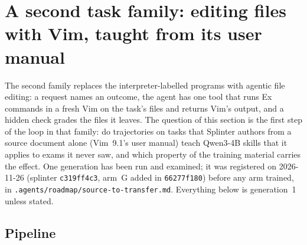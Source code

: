 \section{A second task family: editing files with Vim, taught from its user manual}\label{sec:vim}

The second family replaces the interpreter-labelled programs with agentic file editing: a request names an outcome, the agent
has one tool that runs Ex commands in a fresh Vim on the task's files and returns Vim's output, and a hidden check grades the
files it leaves. The question of this section is the first step of the loop in that family: do trajectories on tasks that
Splinter authors from a source document alone (Vim~9.1's user manual) teach Qwen3-4B skills that it applies to exams it never
saw, and which property of the training material carries the effect. One generation has been run and examined; it was
registered on 2026-11-26 (splinter \texttt{c319ff4c3}, arm~G added in \texttt{66277f180}) before any arm trained, in
\texttt{.agents/roadmap/source-to-transfer.md}. Everything below is generation~1 unless stated.

\subsection{Pipeline}\label{sec:vim-pipeline}

